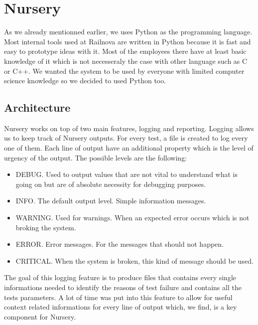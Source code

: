 \documentclass[12pt]{article}
\theoremstyle{definition}
\theoremstyle{definition}
\theoremstyle{remark}
\begin{document}

\section{Nursery}


As we already mentionned earlier, we uses Python as the programming language. Most internal tools used at Railnova are written in Python because it is fast and easy to prototype ideas with it. Most of the employees there have at least basic knowledge of it which is not necesseraly the case with other language such as C or C++. We wanted the system to be used by everyone with limited computer science knowledge so we decided to used Python too.


\subsection{Architecture}

Nursery works on top of two main features, logging and reporting. Logging allows us to keep track of Nursery outputs. For every test, a file is created to log every one of them. Each line of output have an additional property which is the level of urgency of the output. The possible levels are the following:

\begin{itemize}
\item DEBUG. Used to output values that are not vital to understand what is going on but are of absolute necessity for debugging purposes.
\item INFO. The default output level. Simple information messages.
\item WARNING. Used for warnings. When an expected error occurs which is not broking the system.
\item ERROR. Error messages. For the messages that should not happen.
\item CRITICAL. When the system is broken, this kind of message should be used.
\end{itemize}

The goal of this logging feature is to produce files that contains every single informations needed to identify the reasons of test failure and contains all the tests parameters. A lot of time was put into this feature to allow for useful context related informations for every line of output which, we find, is a key component for Nursery.\\
\end{document}
